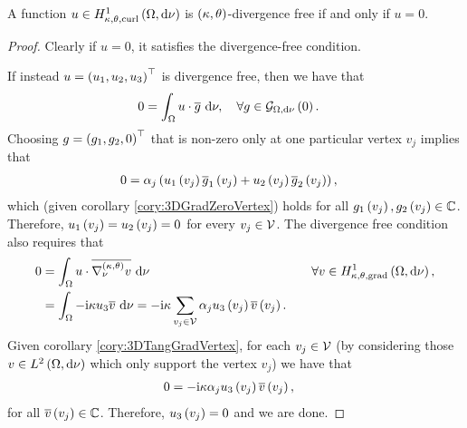 \begin{prop} \label{prop:DivFreeVertex}
	A function $u\in H^1_{\kappa,\theta,\mathrm{curl}}\left( \Omega, \mathrm{d}\nu \right)$ is $\left( \kappa, \theta \right)$-divergence free if and only if $u=0$.
\end{prop}
\begin{proof}
	Clearly if $u=0$, it satisfies the divergence-free condition.
	
	If instead $u=\left( u_1,u_2,u_3 \right)^\top$ is divergence free, then we have that
	\begin{align*}
		0 &= \int_{\Omega} u\cdot \overline{g}  \ \mathrm{d}\nu, \quad\forall g\in\mathcal{G}_{ \Omega, \mathrm{d}\nu}\left( 0 \right).
	\end{align*}
	Choosing $g=\left( g_1,g_2,0 \right)^\top$ that is non-zero only at one particular vertex $v_j$ implies that
	\begin{align*}
		0 &= \alpha_j \left(  u_1\left( v_j \right)\overline{g}_1\left( v_j \right) + u_2\left( v_j \right)\overline{g}_2\left( v_j \right)  \right),
	\end{align*}
	which (given corollary \ref{cory:3DGradZeroVertex}) holds for all $g_1\left( v_j \right), g_2\left( v_j \right)\in\mathbb{C}$.
	Therefore, $u_1\left( v_j \right)=u_2\left( v_j \right)=0$ for every $v_j\in\mathcal{V}$.
	The divergence free condition also requires that
	\begin{align*}
		0 &= \int_{\Omega} u\cdot\overline{\nabla^{\left( \kappa, \theta \right)}_{\nu}v}  \ \mathrm{d}\nu &\quad\forall v\in H^1_{\kappa,\theta,\mathrm{grad}}\left( \Omega, \mathrm{d}\nu \right), \\
		&= \int_{\Omega} -\mathrm{i}\kappa u_3\overline{v}  \ \mathrm{d}\nu
		= -\mathrm{i}\kappa \sum_{v_j\in\mathcal{V}} \alpha_j u_3\left( v_j \right)\overline{v}\left( v_j \right).
	\end{align*}
	Given corollary \ref{cory:3DTangGradVertex}, for each $v_j\in\mathcal{V}$ (by considering those $v\in L^{2}\left( \Omega,\mathrm{d}\nu \right)$ which only support the vertex $v_j$) we have that
	\begin{align*}
		0 &= -\mathrm{i}\kappa \alpha_j u_3\left( v_j \right)\overline{v}\left( v_j \right),
	\end{align*}
	for all $\overline{v}\left( v_j \right)\in\mathbb{C}$.
	Therefore, $u_3\left( v_j \right)=0$ and we are done.
\end{proof}